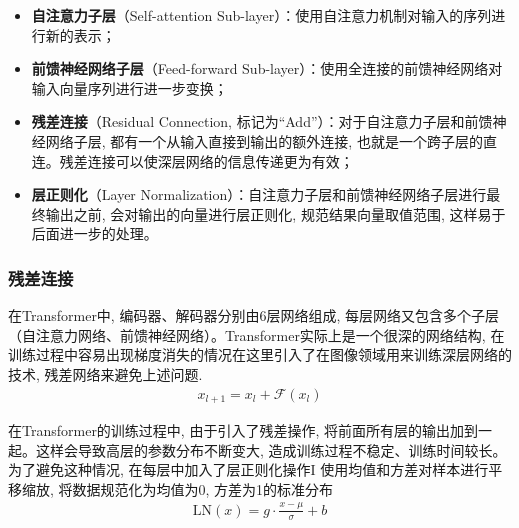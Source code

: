 \documentclass[a4paper]{article}
\begin{document}
    \begin{itemize}
        \vspace{0.5em}
        \item {\small\sffamily\bfseries{自注意力子层}}（Self-attention Sub-layer）：使用自注意力机制对输入的序列进行新的表示；
        \vspace{0.5em}
        \item {\small\sffamily\bfseries{前馈神经网络子层}}（Feed-forward Sub-layer）：使用全连接的前馈神经网络对输入向量序列进行进一步变换；
        \vspace{0.5em}
        \item {\small\sffamily\bfseries{残差连接}}（Residual Connection, 标记为``Add''）：对于自注意力子层和前馈神经网络子层, 都有一个从输入直接到输出的额外连接, 也就是一个跨子层的直连。残差连接可以使深层网络的信息传递更为有效；
        \vspace{0.5em}
        \item {\small\sffamily\bfseries{层正则化}}（Layer Normalization）：自注意力子层和前馈神经网络子层进行最终输出之前, 会对输出的向量进行层正则化, 规范结果向量取值范围, 这样易于后面进一步的处理。
        \vspace{0.5em}
        \end{itemize}

\subsubsection{残差连接}
在Transformer中, 编码器、解码器分别由6层网络组成, 每层网络又包含多个子层（自注意力网络、前馈神经网络）。Transformer实际上是一个很深的网络结构, 在训练过程中容易出现梯度消失的情况在这里引入了在图像领域用来训练深层网络的技术, 残差网络来避免上述问题.
\begin{eqnarray}
    x_{l+1} = x_l + \mathcal{F} (x_l)
    \end{eqnarray}

    在Transformer的训练过程中, 由于引入了残差操作, 将前面所有层的输出加到一起。这样会导致高层的参数分布不断变大, 造成训练过程不稳定、训练时间较长。为了避免这种情况, 在每层中加入了层正则化操作I 使用均值和方差对样本进行平移缩放, 将数据规范化为均值为0, 方差为1的标准分布
    \begin{eqnarray}
        \textrm{LN}(x) = g \cdot \frac{x- \mu} {\sigma} + b
        \end{eqnarray}  
\end{document}
